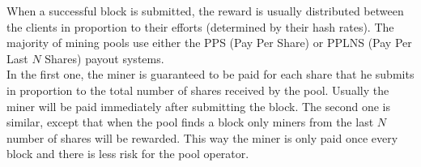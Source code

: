 When a successful block is submitted, the reward is usually distributed between the clients in proportion to their efforts (determined by their hash rates). The majority of mining pools use either the PPS (Pay Per Share) or PPLNS (Pay Per Last $N$ Shares) payout systems. \\

In the first one, the miner is guaranteed to be paid for each share that he submits in proportion to the total number of shares received by the pool. Usually the miner will be paid immediately after submitting the block. The second one is similar, except that when the pool finds a block only miners from the last $N$ number of shares will be rewarded. This way the miner is only paid once every block and there is less risk for the pool operator. \\
